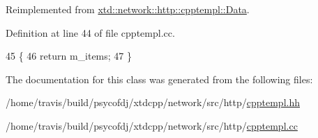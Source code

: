 Reimplemented from \hyperlink{classxtd_1_1network_1_1http_1_1cpptempl_1_1Data_a39713cc7cdc05a2375c1c5d4f00772db}{xtd\-::network\-::http\-::cpptempl\-::\-Data}.



Definition at line 44 of file cpptempl.\-cc.


\begin{DoxyCode}
45 \{
46   \textcolor{keywordflow}{return} m\_items;
47 \}
\end{DoxyCode}


The documentation for this class was generated from the following files\-:\begin{DoxyCompactItemize}
\item 
/home/travis/build/psycofdj/xtdcpp/network/src/http/\hyperlink{cpptempl_8hh}{cpptempl.\-hh}\item 
/home/travis/build/psycofdj/xtdcpp/network/src/http/\hyperlink{cpptempl_8cc}{cpptempl.\-cc}\end{DoxyCompactItemize}
